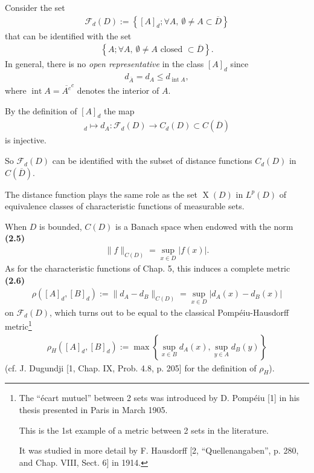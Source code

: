 \documentclass{book}
\numberwithin{equation}{section}
\begin{document}
\begin{enumerate}
    Consider the set
    \begin{align*}
        \mathcal{F}_d(D) := \left\{[A]_d;\forall A,\ \emptyset\ne A\subset\overline{D}\right\}
    \end{align*}
    that can be identified with the set
    \begin{align*}
        \left\{A;\forall A,\ \emptyset\ne A \mbox{ closed } \subset\overline{D}\right\}.
    \end{align*}
    In general, there is no \textit{open representative} in the class $[A]_d$ since
    \begin{align*}
        d_{\overline{A}} = d_A\le d_{\operatorname{int}A},
    \end{align*}
    where $\operatorname{int}A = \overline{A^c}^c$ denotes the interior of $A$.
    
    By the definition of $[A]_d$ the map
    \begin{align*}
        [A]_d\mapsto d_A:\mathcal{F}_d(D)\to C_d(D)\subset C(\overline{D})
    \end{align*}
    is injective.
    
    So $\mathcal{F}_d(D)$ can be identified with the subset of distance functions $C_d(D)$ in $C(\overline{D})$.
    
    The distance function plays the same role as the set $\operatorname{X}(D)$ in $L^p(D)$ of equivalence classes of characteristic functions of measurable sets.
    
    When $D$ is bounded, $C(D)$ is a Banach space when endowed with the norm \textbf{(2.5)}
    \begin{align*}
        \|f\|_{C(D)} = \sup_{x\in D} |f(x)|.
    \end{align*}
    As for the characteristic functions of Chap. 5, this induces a complete metric \textbf{(2.6)}
    \begin{align*}
        \rho([A]_d,[B]_d) := \|d_A - d_B\|_{C(D)} = \sup_{x\in D} |d_A(x) - d_B(x)|
    \end{align*}
    on $\mathcal{F}_d(D)$, which turns out to be equal to the classical Pompéiu-Hausdorff metric\footnote{The ``écart mutuel'' between 2 sets was introduced by D. Pompéiu [1] in his thesis presented in Paris in March 1905.
        
        This is the 1st example of a metric between 2 sets in the literature.
        
        It was studied in more detail by F. Hausdorff [2, ``Quellenangaben'', p. 280, and Chap. VIII, Sect. 6] in 1914.}
    \begin{align*}
        \rho_H([A]_d,[B]_d) := \max\left\{\sup_{x\in B} d_A(x),\sup_{y\in A} d_B(y)\right\}
    \end{align*}
    (cf. J. Dugundji [1, Chap. IX, Prob. 4.8, p. 205] for the definition of $\rho_H$).
    

\end{enumerate}
\end{document}
